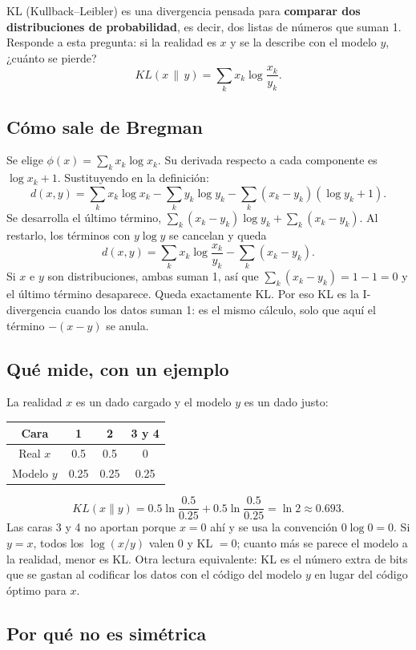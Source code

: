 \documentclass[11pt,a4paper]{article}
\begin{document}
KL (Kullback--Leibler) es una divergencia pensada para \textbf{comparar dos
distribuciones de probabilidad}, es decir, dos listas de números que suman 1.
Responde a esta pregunta: si la realidad es $x$ y se la describe con el modelo
$y$, ¿cuánto se pierde?
\[
  KL(x\,\|\,y)=\sum_k x_k\log\frac{x_k}{y_k}.
\]

\subsection{Cómo sale de Bregman}

Se elige $\phi(x)=\sum_k x_k\log x_k$. Su derivada respecto a cada componente es
$\log x_k+1$. Sustituyendo en la definición:
\[
  d(x,y)=\sum_k x_k\log x_k-\sum_k y_k\log y_k-\sum_k (x_k-y_k)(\log y_k+1).
\]
Se desarrolla el último término, $\sum_k (x_k-y_k)\log y_k+\sum_k (x_k-y_k)$. Al
restarlo, los términos con $y\log y$ se cancelan y queda
\[
  d(x,y)=\sum_k x_k\log\frac{x_k}{y_k}-\sum_k (x_k-y_k).
\]
Si $x$ e $y$ son distribuciones, ambas suman 1, así que
$\sum_k (x_k-y_k)=1-1=0$ y el último término desaparece. Queda exactamente KL.
Por eso KL es la I-divergencia cuando los datos suman 1: es el mismo cálculo, solo
que aquí el término $-(x-y)$ se anula.

\subsection{Qué mide, con un ejemplo}

La realidad $x$ es un dado cargado y el modelo $y$ es un dado justo:
\begin{center}
\begin{tabular}{cccc}
\toprule
Cara & 1 & 2 & 3 y 4 \\
\midrule
Real $x$ & 0.5 & 0.5 & 0 \\
Modelo $y$ & 0.25 & 0.25 & 0.25 \\
\bottomrule
\end{tabular}
\end{center}
\[
  KL(x\|y)=0.5\ln\frac{0.5}{0.25}+0.5\ln\frac{0.5}{0.25}=\ln 2\approx 0.693.
\]
Las caras 3 y 4 no aportan porque $x=0$ ahí y se usa la convención
$0\log 0=0$. Si $y=x$, todos los $\log(x/y)$ valen 0 y KL $=0$; cuanto más se
parece el modelo a la realidad, menor es KL. Otra lectura equivalente: KL es el
número extra de bits que se gastan al codificar los datos con el código del modelo
$y$ en lugar del código óptimo para $x$.

\subsection{Por qué no es simétrica}
\end{document}
